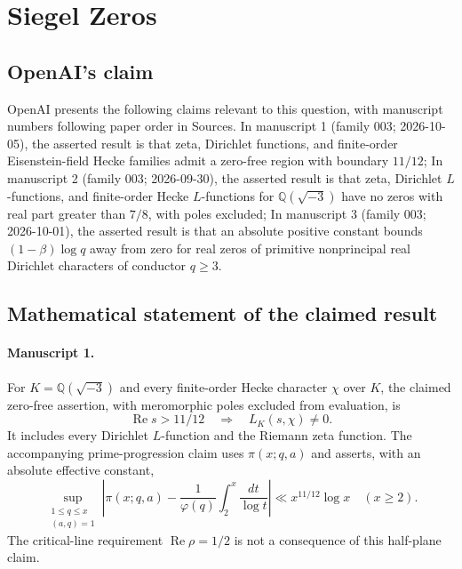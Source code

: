 \documentclass[11pt]{article}
\begin{document}
\section*{Siegel Zeros}

\subsection{OpenAI's claim}
OpenAI presents the following claims relevant to this question, with manuscript numbers following paper order in Sources. In manuscript 1 (family 003; 2026-10-05), the asserted result is that zeta, Dirichlet functions, and finite-order Eisenstein-field Hecke families admit a zero-free region with boundary $11/12$; In manuscript 2 (family 003; 2026-09-30), the asserted result is that zeta, Dirichlet $L$-functions, and finite-order Hecke $L$-functions for $\mathbb Q(\sqrt{-3})$ have no zeros with real part greater than $7/8$, with poles excluded; In manuscript 3 (family 003; 2026-10-01), the asserted result is that an absolute positive constant bounds $(1-\beta)\log q$ away from zero for real zeros of primitive nonprincipal real Dirichlet characters of conductor $q\ge3$.

\subsection{Mathematical statement of the claimed result}
\paragraph{Manuscript 1.}
For $K=\mathbb Q(\sqrt{-3})$ and every finite-order Hecke character $\chi$ over $K$, the claimed zero-free assertion, with meromorphic poles excluded from evaluation, is
\[
 \operatorname{Re}s>11/12\quad\Longrightarrow\quad L_K(s,\chi)\ne0.
\]
It includes every Dirichlet $L$-function and the Riemann zeta function. The accompanying prime-progression claim uses $\pi(x;q,a)$ and asserts, with an absolute effective constant,
\[
 \sup_{\substack{1\le q\le x\\(a,q)=1}}
 \left|\pi(x;q,a)-\frac1{\varphi(q)}\int_2^x\frac{dt}{\log t}\right|
 \ll x^{11/12}\log x\quad(x\ge2).
\]
The critical-line requirement $\operatorname{Re}\rho=1/2$ is not a consequence of this half-plane claim.
\end{document}
